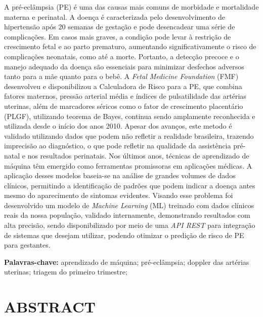 \documentclass[12pt, a4paper]{report}
\theoremstyle{definition}
\theoremstyle{remark}
\theoremstyle{plain}
\begin{document}
\noindent A pré-eclâmpsia (PE) é uma das causas mais comuns de morbidade e mortalidade materna e perinatal. A doença é caracterizada pelo desenvolvimento de hipertensão após 20 semanas de gestação e pode desencadear uma série de complicações. Em casos mais graves, a condição pode levar à restrição de crescimento fetal e ao parto prematuro, aumentando significativamente o risco de complicações neonatais, como até a morte. Portanto, a detecção precoce e o manejo adequado da doença são essenciais para minimizar desfechos adversos tanto para a mãe quanto para o bebê. A \textit{Fetal Medicine Foundation} (FMF) desenvolveu e disponibilizou a Calculadora de Risco para a PE, que combina fatores maternos, pressão arterial média e índices de pulsatilidade das artérias uterinas, além de marcadores séricos como o fator de crescimento placentário (PLGF), utilizando teorema de Bayes, continua sendo amplamente reconhecida e utilizada desde o início dos anos 2010. Apesar dos avanços, este metodo é validado utilizando dados que podem não refletir a realidade brasileira, trazendo imprecisão ao diagnóstico, o que pode refletir na qualidade da assistência pré-natal e nos resultados perinatais. Nos últimos anos, técnicas de aprendizado de máquina têm emergido como ferramentas promissoras em aplicações médicas. A aplicação desses modelos baseia-se na análise de grandes volumes de dados clínicos, permitindo a identificação de padrões que podem indicar a doença antes mesmo do aparecimento de sintomas evidentes. Visando esse problema foi desenvolvido um modelo de \textit{Machine Learning} (ML) treinado com dados clínicos reais da nossa população, validado internamente, demonstrando resultados com alta precisão, sendo disponibilizado por meio de uma \textit{API REST} para integração de sistemas que desejam utilizar, podendo otimizar o predição de risco de PE para gestantes.

\vspace*{0.5cm}

\noindent\textbf{Palavras-chave:} aprendizado de máquina; pré-eclâmpsia; doppler das artérias uterinas; triagem do primeiro trimestre;
 \newpage


\thispagestyle{empty}
\section*{\normalsize \centering \textbf{ABSTRACT}}
\end{document}
